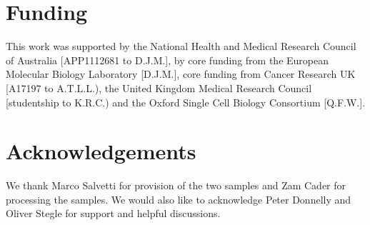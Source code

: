 \documentclass{bioinfo}
\begin{document}
\section*{Funding}

This work was supported by the National Health and Medical Research Council of Australia [APP1112681 to D.J.M.], by core funding from the European Molecular Biology Laboratory [D.J.M.], core funding from Cancer Research UK [A17197 to A.T.L.L.), the United Kingdom Medical Research Council [studentship to K.R.C.) and the Oxford Single Cell Biology Consortium [Q.F.W.].\vspace*{-12pt}


\section*{Acknowledgements}\label{acknowledgements}

We thank Marco Salvetti for provision of the two samples and Zam Cader for processing the samples. We would also like to acknowledge Peter Donnelly and Oliver Stegle for support and helpful discussions.\vspace*{-12pt}


%
%
%
%
%

\end{document}

